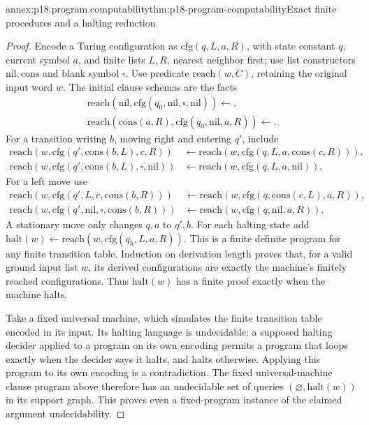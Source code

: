\begin{annexitem}{annex:p18.program.computability}{thm:p18-program-computability}{Exact finite procedures and a halting reduction}
\begin{proof}
Encode a Turing configuration as
\(\mathrm{cfg}(q,L,a,R)\), with state
constant \(q\), current symbol \(a\),
and finite lists \(L,R\), nearest
neighbor first; use list constructors
\(\mathrm{nil},\mathrm{cons}\) and
blank symbol \(\square\).
Use predicate \(\mathrm{reach}(w,C)\),
retaining the original input word \(w\).
The initial clause schemas are the facts
\[
\begin{gathered}
 \mathrm{reach}(\mathrm{nil},\mathrm{cfg}(q_0,\mathrm{nil},\square,\mathrm{nil}))
                         \leftarrow,\\
 \mathrm{reach}(\mathrm{cons}(a,R),
                    \mathrm{cfg}(q_0,\mathrm{nil},a,R))\leftarrow.
\end{gathered}
\]
For a transition writing \(b\), moving right
and entering \(q'\), include
\[
\begin{aligned}
 \mathrm{reach}(w,\mathrm{cfg}(q',\mathrm{cons}(b,L),c,R))
   &\leftarrow\mathrm{reach}(w,\mathrm{cfg}(q,L,a,\mathrm{cons}(c,R))),\\
 \mathrm{reach}(w,\mathrm{cfg}(q',\mathrm{cons}(b,L),\square,\mathrm{nil}))
   &\leftarrow\mathrm{reach}(w,\mathrm{cfg}(q,L,a,\mathrm{nil})).
\end{aligned}
\]
For a left move use
\[
\begin{aligned}
 \mathrm{reach}(w,\mathrm{cfg}(q',L,c,\mathrm{cons}(b,R)))
   &\leftarrow\mathrm{reach}(w,\mathrm{cfg}(q,\mathrm{cons}(c,L),a,R)),\\
 \mathrm{reach}(w,\mathrm{cfg}(q',\mathrm{nil},\square,\mathrm{cons}(b,R)))
   &\leftarrow\mathrm{reach}(w,\mathrm{cfg}(q,\mathrm{nil},a,R)).
\end{aligned}
\]
A stationary move only changes \(q,a\) to \(q',b\).
For each halting state add
\(\mathrm{halt}(w)\leftarrow
  \mathrm{reach}(w,\mathrm{cfg}(q_h,L,a,R))\).
This is a finite definite program for any
finite transition table. Induction on
derivation length proves that, for a
valid ground input list \(w\), its
derived configurations are exactly the
machine's finitely reached configurations.
Thus \(\mathrm{halt}(w)\) has a finite
proof exactly when the machine halts.

Take a fixed universal machine, which
simulates the finite transition table
encoded in its input. Its halting
language is undecidable: a supposed
halting decider applied to a program
on its own encoding permits a program
that loops exactly when the decider
says it halts, and halts otherwise.
Applying this program to its own
encoding is a contradiction.
The fixed universal-machine clause
program above therefore has an
undecidable set of queries
\((\varnothing,\mathrm{halt}(w))\)
in its support graph. This proves
even a fixed-program instance of
the claimed argument undecidability.


\end{proof}
\end{annexitem}
